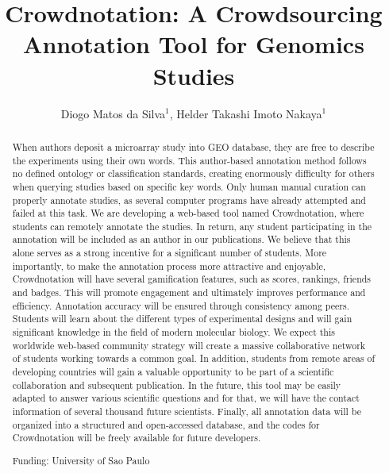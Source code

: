 \documentclass[twoside]{article}
\title{\vspace{-15mm}\fontsize{24pt}{10pt}\selectfont\textbf{Crowdnotation: A Crowdsourcing Annotation Tool for Genomics Studies}} %
\author{Diogo Matos da Silva$^1$, Helder Takashi Imoto Nakaya$^1$}
\affil{1 USP\\ }
\date{}
\begin{document}
\maketitle %

\thispagestyle{fancy} %


\begin{abstract}
When authors deposit a microarray study into GEO database, they are free to describe the experiments using their own words. This author-based annotation method follows no defined ontology or classification standards, creating enormously difficulty for others when querying studies based on specific key words. Only human manual curation can properly annotate studies, as several computer programs have already attempted and failed at this task. 
We are developing a web-based tool named Crowdnotation, where students can remotely annotate the studies. In return, any student participating in the annotation will be included as an author in our publications. We believe that this alone serves as a strong incentive for a significant number of students. More importantly, to make the annotation process more attractive and enjoyable, Crowdnotation will have several gamification features, such as scores, rankings, friends and badges. This will promote engagement and ultimately improves performance and efficiency. 
Annotation accuracy will be ensured through consistency among peers. Students will learn about the different types of experimental designs and will gain significant knowledge in the field of modern molecular biology.
We expect this worldwide web-based community strategy will create a massive collaborative network of students working towards a common goal. In addition, students from remote areas of developing countries will gain a valuable opportunity to be part of a scientific collaboration and subsequent publication. In the future, this tool may be easily adapted to answer various scientific questions and for that, we will have the contact information of several thousand future scientists. Finally, all annotation data will be organized into a structured and open-accessed database, and the codes for Crowdnotation will be freely available for future developers.

Funding: University of Sao Paulo
\end{abstract}
\end{document}
